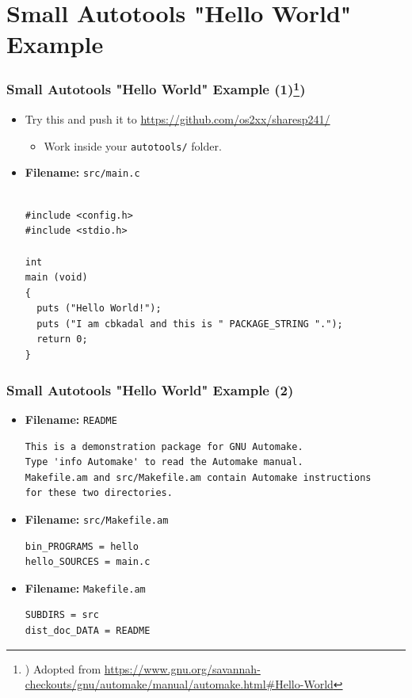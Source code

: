 \documentclass[aspectratio=169, xcolor=table, notheorems, hyperref={pdfpagelabels=false}]{beamer}
\begin{document}
\section{Small Autotools "Hello World" Example}
\begin{frame}[fragile]
\frametitle{Small Autotools "Hello World" Example (1)\footnote{%
) Adopted from {\tiny \url{https://www.gnu.org/savannah-checkouts/gnu/automake/manual/automake.html\#Hello-World}}%
})}

\begin{itemize}
\item Try this and push it to \url{https://github.com/os2xx/sharesp241/}
\begin{itemize}
\item Work inside your \texttt{autotools/} folder.
\end{itemize}

\item \textbf{Filename:} \texttt{src/main.c}
\begin{lstlisting}[basicstyle=\ttfamily\small]

#include <config.h>
#include <stdio.h>

int
main (void)
{
  puts ("Hello World!");
  puts ("I am cbkadal and this is " PACKAGE_STRING ".");
  return 0;
}

\end{lstlisting}
\end{itemize}

\end{frame}

\begin{frame}[fragile]
\frametitle{Small Autotools "Hello World" Example (2)}

\begin{itemize}
\item \textbf{Filename:} \texttt{README}
\begin{lstlisting}[basicstyle=\ttfamily\small]
This is a demonstration package for GNU Automake.
Type 'info Automake' to read the Automake manual.
Makefile.am and src/Makefile.am contain Automake instructions 
for these two directories.
\end{lstlisting}

\item \textbf{Filename:} \texttt{src/Makefile.am}
\begin{lstlisting}[basicstyle=\ttfamily\small]
bin_PROGRAMS = hello
hello_SOURCES = main.c
\end{lstlisting}

\item \textbf{Filename:} \texttt{Makefile.am}
\begin{lstlisting}[basicstyle=\ttfamily\small]
SUBDIRS = src
dist_doc_DATA = README

\end{lstlisting}
\end{itemize}

\end{frame}
\end{document}
